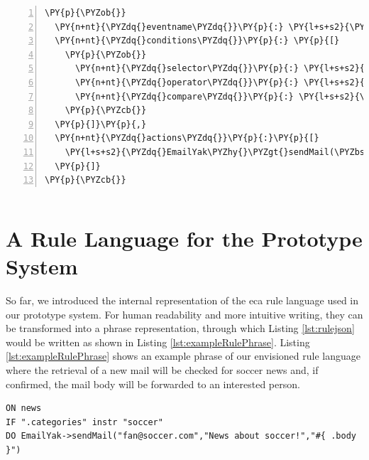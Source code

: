 \begin{Verbatim}[samepage=true,frame=single,fontsize=\footnotesize,commandchars=\\\{\},numbers=left,firstnumber=1,stepnumber=1,xleftmargin
=.3in]
\PY{p}{\PYZob{}}
  \PY{n+nt}{\PYZdq{}eventname\PYZdq{}}\PY{p}{:} \PY{l+s+s2}{\PYZdq{}news\PYZdq{}}\PY{p}{,}
  \PY{n+nt}{\PYZdq{}conditions\PYZdq{}}\PY{p}{:} \PY{p}{[}
    \PY{p}{\PYZob{}}
      \PY{n+nt}{\PYZdq{}selector\PYZdq{}}\PY{p}{:} \PY{l+s+s2}{\PYZdq{}.categories\PYZdq{}}\PY{p}{,}
      \PY{n+nt}{\PYZdq{}operator\PYZdq{}}\PY{p}{:} \PY{l+s+s2}{\PYZdq{}instr\PYZdq{}}\PY{p}{,}
      \PY{n+nt}{\PYZdq{}compare\PYZdq{}}\PY{p}{:} \PY{l+s+s2}{\PYZdq{}soccer\PYZdq{}}
    \PY{p}{\PYZcb{}}
  \PY{p}{]}\PY{p}{,}
  \PY{n+nt}{\PYZdq{}actions\PYZdq{}}\PY{p}{:}\PY{p}{[}
    \PY{l+s+s2}{\PYZdq{}EmailYak\PYZhy{}\PYZgt{}sendMail(\PYZbs{}\PYZdq{}fan@soccer.com\PYZbs{}\PYZdq{},\PYZbs{}\PYZdq{}News about soccer!\PYZbs{}\PYZdq{},\PYZbs{}\PYZdq{}\PYZsh{}\PYZob{} .body \PYZcb{}\PYZbs{}\PYZdq{})\PYZdq{}}
  \PY{p}{]}
\PY{p}{\PYZcb{}}
\end{Verbatim}
\begin{lstlisting}[float=h,frame=no,label=lst:rulejson,caption=Rule Example expressed in \textrm{\acrshort{json}}]
\end{lstlisting}

\section{A Rule Language for the Prototype System}
So far, we introduced the internal representation of the \textrm{\acrshort{eca}} rule language used in our prototype system.
For human readability and more intuitive writing, they can be transformed into a phrase representation, through which Listing \ref{lst:rulejson} would be written as shown in Listing \ref{lst:exampleRulePhrase}.
Listing \ref{lst:exampleRulePhrase} shows an example phrase of our envisioned rule language where the retrieval of a new mail will be checked for soccer news and, if confirmed, the mail body will be forwarded to an interested person.

\begin{lstlisting}[float=h,language=OwnRule,label={lst:exampleRulePhrase},caption=Example Phrase in Prototype Rule Language]
ON news
IF ".categories" instr "soccer"
DO EmailYak->sendMail("fan@soccer.com","News about soccer!","#{ .body }")
\end{lstlisting}

